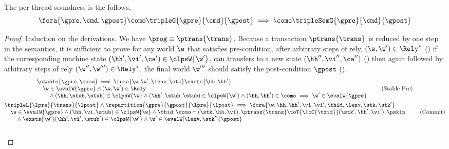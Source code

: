 \begin{thm}
The per-thread soundness is the follows,
\[
    \fora{\gpre, \cmd, \gpost}
    \como \tripleG{\gpre}{\cmd}{\gpost} 
    \implies 
    \como \tripleSemG{\gpre}{\cmd}{\gpost} 
\]
\end{thm}
\begin{proof}
Induction on the derivations.
We have \( \prog \equiv \ptrans{\trans} \).
Because a transaction \( \ptrans{\trans} \) is reduced by one step in the semantics, it is sufficient to prove for any world \(\w\) that satisfies pre-condition, after arbitrary steps of rely, \ie \( (\w, \w') \in \Rely^{*} \) () if the corresponding machine state \((\hh',\vi', \ca') \in \clpsW{\w'}\), can transfers to a new state \((\hh'',\vi'', \ca'')\) () then again followed by arbitrary steps of rely \((\w'',\w''') \in \Rely^{*} \), the final world \( \w''' \) should satisfy the post-condition \(\gpost\) ().
\begin{gather}
    \begin{array}{@{}l}
    \stable{\gpre, \como}  
    \implies 
    \fora{\w, \w',\lenv, \stk}  
    \exsts{ \hh, \hh' } \\
    \quad \w \in \evalW{\gpre} 
    \land (\w, \w') \in \Rely \\
    \qquad {} \land (\hh, \stub, \stub) \in \clpsW{\w}
    \land (\hh', \stub, \stub) \in \clpsW{\w'}
    \land (\hh, \hh') \in \como
    \implies \w' \in \evalW{\gpre} 
    \end{array} \tag{Stable Pre} \label{equ:stable-pre-condition} \\
%
    \begin{array}{@{}l}
    \tripleL{\lpre}{\trans}{\lpost}
    \land \repartition{\gpre}{\gpost}{\lpre}{\lpost}
    \implies 
    \fora{\w, \hh, \hh', \vi, \vi', \thid, \lenv, \stk, \stk'} \\
    \quad \w \in \evalW{\gpre}
    \land (\hh, \vi, \stub) \in \clpsW{\w} 
    \land \thid, \como \vdash (\stk, \hh, \vi), \ptrans{\trans} 
    \toT{\lbC{\txid}} (\stk', \hh', \vi'), \pskip  \\
    \qquad {} \land \exsts{\w'}
    (\hh', \vi', \stub') \in \clpsW{\w'} 
    \land \w' \in \evalW[\lenv, \stk']{\gpost} 
    \end{array} \label{equ:commit-transaction} \tag{Commit} \\
%
    \begin{array}{@{}l}

\end{array}
\end{gather}
\end{proof}
